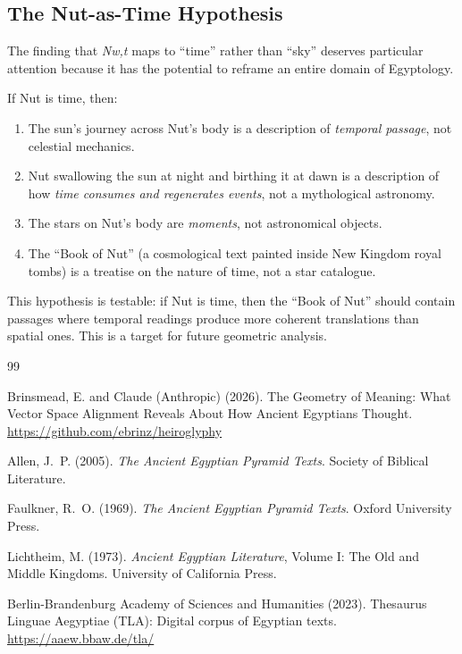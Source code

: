 \documentclass[11pt, a4paper]{article}
\begin{document}
\subsection{The Nut-as-Time Hypothesis}

The finding that \textit{Nw,t} maps to ``time'' rather than ``sky'' deserves particular attention because it has the potential to reframe an entire domain of Egyptology.

If Nut is time, then:

\begin{enumerate}
    \item The sun's journey across Nut's body is a description of \textit{temporal passage}, not celestial mechanics.
    \item Nut swallowing the sun at night and birthing it at dawn is a description of how \textit{time consumes and regenerates events}, not a mythological astronomy.
    \item The stars on Nut's body are \textit{moments}, not astronomical objects.
    \item The ``Book of Nut'' (a cosmological text painted inside New Kingdom royal tombs) is a treatise on the nature of time, not a star catalogue.
\end{enumerate}

This hypothesis is testable: if Nut is time, then the ``Book of Nut'' should contain passages where temporal readings produce more coherent translations than spatial ones. This is a target for future geometric analysis.


\begin{thebibliography}{99}

Brinsmead, E. and Claude (Anthropic) (2026).
\newblock The Geometry of Meaning: What Vector Space Alignment Reveals About How Ancient Egyptians Thought.
\newblock \url{https://github.com/ebrinz/heiroglyphy}

Allen, J.~P. (2005).
\newblock \textit{The Ancient Egyptian Pyramid Texts}.
\newblock Society of Biblical Literature.

Faulkner, R.~O. (1969).
\newblock \textit{The Ancient Egyptian Pyramid Texts}.
\newblock Oxford University Press.

Lichtheim, M. (1973).
\newblock \textit{Ancient Egyptian Literature}, Volume I: The Old and Middle Kingdoms.
\newblock University of California Press.

Berlin-Brandenburg Academy of Sciences and Humanities (2023).
\newblock Thesaurus Linguae Aegyptiae (TLA): Digital corpus of Egyptian texts.
\newblock \url{https://aaew.bbaw.de/tla/}

\end{thebibliography}
\end{document}
